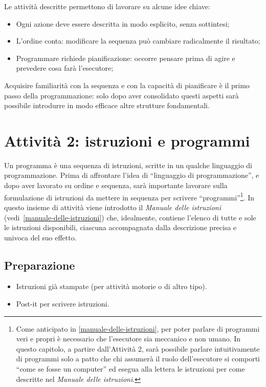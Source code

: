 Le attività descritte permettono di lavorare su alcune idee chiave:
\begin{itemize}
\item
  Ogni azione deve essere descritta in modo esplicito, senza sottintesi;
\item
  L'ordine conta: modificare la sequenza può cambiare radicalmente il risultato;
\item
  Programmare richiede pianificazione: occorre pensare prima di agire e prevedere cosa farà l'esecutore;
\end{itemize}

Acquisire familiarità con la sequenza e con la capacità di pianificare è il primo passo della programmazione: solo dopo aver consolidato questi aspetti sarà possibile introdurre in modo efficace altre strutture fondamentali.

\section{Attività 2: istruzioni e programmi}

Un programma è una sequenza di istruzioni, scritte in un qualche linguaggio di programmazione. Prima di affrontare l'idea di ``linguaggio di programmazione'', e dopo aver lavorato su ordine e sequenza, sarà importante lavorare sulla formulazione di istruzioni da mettere in sequenza per scrivere ``programmi''\footnote{Come anticipato in \ref{manuale-delle-istruzioni}, per poter parlare di programmi veri e propri è necessario che l'esecutore sia meccanico e non umano. In questo capitolo, a partire dall'Attività 2, sarà possibile parlare intuitivamente di programmi solo a patto che chi assumerà il ruolo dell'esecutore si comporti ``come se fosse un computer'' ed esegua alla lettera le istruzioni per come descritte nel \emph{Manuale delle istruzioni}.}. In questo insieme di attività viene introdotto il \emph{Manuale delle istruzioni} (vedi~\ref{manuale-delle-istruzioni}) che, idealmente, contiene l'elenco di tutte e sole le istruzioni disponibili, ciascuna accompagnata dalla descrizione precisa e univoca del suo effetto.

\subsection{Preparazione }\label{preparazione}

\begin{itemize}
\item
  Istruzioni già stampate (per attività motorie o di altro tipo).
\item
  Post-it per scrivere istruzioni.
\end{itemize}

